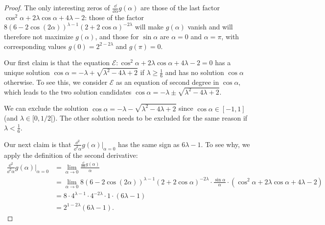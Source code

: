 \documentclass[11pt]{llncs}
\begin{document}
\begin{proof}
    The only interesting zeros of $\frac{\dd}{\dd\alpha}g(\alpha)$ are those of the last factor 
    $\cos^2\alpha+2\lambda\cos\alpha+4\lambda-2$: those of the factor $8(6-2\cos(2\alpha))^{\lambda-1}(2+2\cos\alpha)^{-2\lambda}$ will make $g(\alpha)$ vanish and will therefore not maximize $g(\alpha)$, and those for $\sin\alpha$ are $\alpha=0$ and $\alpha=\pi$, with corresponding values $g(0)=2^{2-2\lambda}$ and $g(\pi)=0$.
    
    Our first claim is that the equation $\mathcal E:\cos^2\alpha+2\lambda\cos\alpha+4\lambda-2=0$ has a unique solution $\cos\alpha=-\lambda+\sqrt{\lambda^2-4\lambda+2}$ if $\lambda\geq\frac 16$ and has no solution $\cos\alpha$ otherwise. To see this, we consider $\mathcal E$ as an equation of second degree in $\cos\alpha$, which leads to the two solution candidates $\cos\alpha=-\lambda\pm\sqrt{\lambda^2-4\lambda+2}$.
     
    We can exclude the solution $\cos\alpha=-\lambda-\sqrt{\lambda^2-4\lambda+2}$ since $\cos\alpha\in[-1,1]$ (and $\lambda\in [0,1/2[$). 
    The other solution needs to be excluded for the same reason if $\lambda<\frac 16$.


    Our next claim is that $\frac{\dd^2}{\dd^2\alpha}g(\alpha)\vert_{\alpha=0}$ has the same sign as $6\lambda -1$. To see why, we apply the definition of the second derivative:
    \begin{align*}
        \frac{\dd^2}{\dd^2\alpha}g(\alpha)\vert_{\alpha=0}
        &=\lim_{\alpha\to 0}\frac{\frac{\dd}{\dd\alpha}g(\alpha)}{\alpha}\\
        &=\lim_{\alpha\to 0}8(6-2\cos(2\alpha))^{\lambda-1}(2+2\cos\alpha)^{-2\lambda}\cdot\frac{\sin\alpha}{\alpha}\cdot\left(\cos^2\alpha+2\lambda\cos\alpha+4\lambda-2\right)\\
        &=8\cdot4^{\lambda-1}\cdot 4^{-2\lambda}\cdot 1\cdot(6\lambda -1)\\
        &=2^{1-2\lambda}(6\lambda -1).
    \end{align*}



\end{proof}
\end{document}
